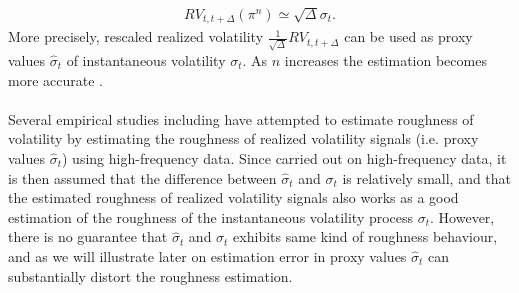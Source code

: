\documentclass{article}
\begin{document}
\begin{align*}
 RV_{t,t+\Delta} (\pi^n)\simeq \sqrt{\Delta} \sigma_t.
\end{align*}
More precisely, rescaled realized volatility $\frac{1}{\sqrt{\Delta}}RV_{t,t+\Delta}$ can be used as proxy values $\hat{\sigma}_t$ of instantaneous volatility $\sigma_t$. As $n$ increases the estimation becomes more accurate \cite{cont}.\\\\
Several empirical studies including \cite{gatheral} have attempted to estimate roughness of volatility by estimating the roughness of realized volatility signals (i.e. proxy values $\hat{\sigma}_t$) using high-frequency data. Since carried out on high-frequency data, it is then assumed that the difference between $\hat{\sigma}_t$ and $\sigma_t$ is relatively small, and that the estimated roughness of realized volatility signals also works as a good estimation of the roughness of the instantaneous volatility process $\sigma_t$. However, there is no guarantee that $\hat{\sigma}_t$ and $\sigma_t$ exhibits same kind of roughness behaviour, and as we will illustrate later on estimation error in proxy values $\hat{\sigma}_t$ can substantially distort the roughness estimation.
\end{document}
